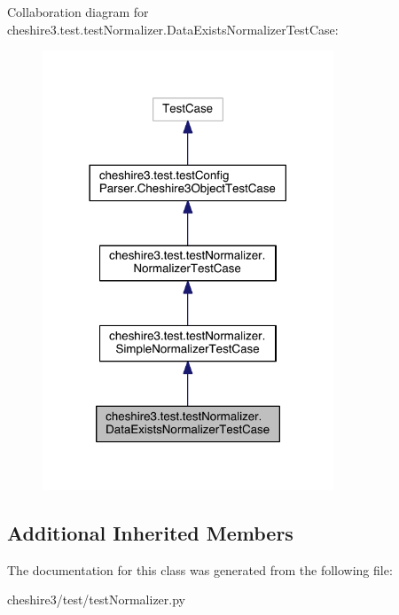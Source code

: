 Collaboration diagram for cheshire3.\-test.\-test\-Normalizer.\-Data\-Exists\-Normalizer\-Test\-Case\-:
\nopagebreak
\begin{figure}[H]
\begin{center}
\leavevmode
\includegraphics[width=246pt]{classcheshire3_1_1test_1_1test_normalizer_1_1_data_exists_normalizer_test_case__coll__graph}
\end{center}
\end{figure}
\subsection*{Additional Inherited Members}


The documentation for this class was generated from the following file\-:\begin{DoxyCompactItemize}
\item 
cheshire3/test/test\-Normalizer.\-py\end{DoxyCompactItemize}
